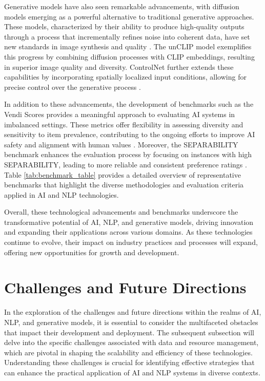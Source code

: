 Generative models have also seen remarkable advancements, with diffusion models emerging as a powerful alternative to traditional generative approaches. These models, characterized by their ability to produce high-quality outputs through a process that incrementally refines noise into coherent data, have set new standards in image synthesis and quality \cite{dhariwal2021diffusion}. The unCLIP model exemplifies this progress by combining diffusion processes with CLIP embeddings, resulting in superior image quality and diversity. ControlNet further extends these capabilities by incorporating spatially localized input conditions, allowing for precise control over the generative process \cite{zhang2023adding}.

In addition to these advancements, the development of benchmarks such as the Vendi Scores provides a meaningful approach to evaluating AI systems in imbalanced settings. These metrics offer flexibility in assessing diversity and sensitivity to item prevalence, contributing to the ongoing efforts to improve AI safety and alignment with human values \cite{pasarkar2024cousinsvendiscorefamily}. Moreover, the SEPARABILITY benchmark enhances the evaluation process by focusing on instances with high SEPARABILITY, leading to more reliable and consistent preference ratings \cite{ghosh2024comparedespairreliablepreference}. Table \ref{tab:benchmark_table} provides a detailed overview of representative benchmarks that highlight the diverse methodologies and evaluation criteria applied in AI and NLP technologies.

Overall, these technological advancements and benchmarks underscore the transformative potential of AI, NLP, and generative models, driving innovation and expanding their applications across various domains. As these technologies continue to evolve, their impact on industry practices and processes will expand, offering new opportunities for growth and development.










\section{Challenges and Future Directions} \label{sec:Challenges and Future Directions}

In the exploration of the challenges and future directions within the realms of AI, NLP, and generative models, it is essential to consider the multifaceted obstacles that impact their development and deployment. The subsequent subsection will delve into the specific challenges associated with data and resource management, which are pivotal in shaping the scalability and efficiency of these technologies. Understanding these challenges is crucial for identifying effective strategies that can enhance the practical application of AI and NLP systems in diverse contexts.





